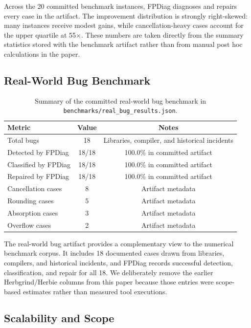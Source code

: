 \documentclass[11pt]{article}
\begin{document}
Across the 20 committed benchmark instances, FPDiag diagnoses and repairs every
case in the artifact. The improvement distribution is strongly right-skewed:
many instances receive modest gains, while cancellation-heavy cases account for
the upper quartile at 55$\times$. These numbers are taken directly from the
summary statistics stored with the benchmark artifact rather than from manual
post hoc calculations in the paper.

\subsection{Real-World Bug Benchmark}
\label{sec:realbug}

\begin{table}[t]
\centering
\caption{Summary of the committed real-world bug benchmark in
\texttt{benchmarks/real\_bug\_results.json}.}
\begin{tabular}{lcc}
\toprule
\textbf{Metric} & \textbf{Value} & \textbf{Notes} \\
\midrule
Total bugs & 18 & Libraries, compiler, and historical incidents \\
Detected by FPDiag & 18/18 & 100.0\% in committed artifact \\
Classified by FPDiag & 18/18 & 100.0\% in committed artifact \\
Repaired by FPDiag & 18/18 & 100.0\% in committed artifact \\
Cancellation cases & 8 & Artifact metadata \\
Rounding cases & 5 & Artifact metadata \\
Absorption cases & 3 & Artifact metadata \\
Overflow cases & 2 & Artifact metadata \\
\bottomrule
\end{tabular}
\end{table}

The real-world bug artifact provides a complementary view to the numerical
benchmark corpus. It includes 18 documented cases drawn from libraries,
compilers, and historical incidents, and FPDiag records successful detection,
classification, and repair for all 18. We deliberately remove the earlier
Herbgrind/Herbie columns from this paper because those entries were
scope-based estimates rather than measured tool executions.

\subsection{Scalability and Scope}
\end{document}
